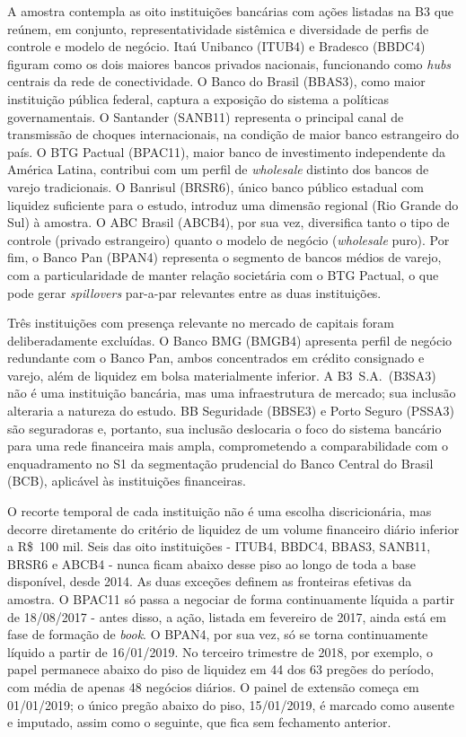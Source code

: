 \documentclass[12pt, a4paper, oneside, english, brazil]{abntex2}
\begin{document}
A amostra contempla as oito instituições bancárias com ações listadas na B3 que reúnem, em
conjunto, representatividade sistêmica e diversidade de perfis de controle e modelo de negócio.
Itaú Unibanco (ITUB4) e Bradesco (BBDC4) figuram como os dois maiores bancos privados nacionais,
funcionando como \textit{hubs} centrais da rede de conectividade. O Banco do Brasil (BBAS3),
como maior instituição pública federal, captura a exposição do sistema a políticas governamentais.
O Santander (SANB11) representa o principal canal de transmissão de choques internacionais, 
na condição de maior banco estrangeiro do país. O BTG Pactual (BPAC11), maior banco de 
investimento independente da América Latina, contribui com um perfil de \textit{wholesale} 
distinto dos bancos de varejo tradicionais. O Banrisul (BRSR6), único banco público estadual 
com liquidez suficiente para o estudo, introduz uma dimensão regional (Rio Grande do Sul) à 
amostra. O ABC Brasil (ABCB4), por sua vez, diversifica tanto o tipo de controle 
(privado estrangeiro) quanto o modelo de negócio (\textit{wholesale} puro). Por fim, o 
Banco Pan (BPAN4) representa o segmento de bancos médios de varejo, com a particularidade de 
manter relação societária com o BTG Pactual, o que pode gerar \textit{spillovers} 
par-a-par relevantes entre as duas instituições.

Três instituições com presença relevante no mercado de capitais foram deliberadamente
excluídas. O Banco BMG (BMGB4) apresenta perfil de negócio redundante com o Banco Pan,
ambos concentrados em crédito consignado e varejo, além de liquidez em bolsa
materialmente inferior. A B3~S.A.\ (B3SA3) não é uma instituição bancária, mas uma
infraestrutura de mercado; sua inclusão alteraria a natureza do estudo. BB Seguridade
(BBSE3) e Porto Seguro (PSSA3) são seguradoras e, portanto, sua inclusão deslocaria o foco
do sistema bancário para uma rede financeira mais ampla, comprometendo a comparabilidade
com o enquadramento no S1 da segmentação prudencial do Banco Central do Brasil (BCB),
aplicável às instituições financeiras.

O recorte temporal de cada instituição não é uma escolha discricionária, mas
decorre diretamente do critério de liquidez de um volume financeiro diário inferior a R\$~100 mil. 
Seis das oito instituições -
ITUB4, BBDC4, BBAS3, SANB11, BRSR6 e ABCB4 - nunca ficam abaixo desse piso ao
longo de toda a base disponível, desde 2014. As duas exceções definem as
fronteiras efetivas da amostra. O BPAC11 só passa a negociar de forma
continuamente líquida a partir de 18/08/2017 - antes disso, a ação, listada em
fevereiro de 2017, ainda está em fase de formação de \textit{book}. O BPAN4, por sua vez,
só se torna continuamente líquido a partir de 16/01/2019. No terceiro trimestre
de 2018, por exemplo, o papel permanece abaixo do piso de liquidez em 44 dos 63
pregões do período, com média de apenas 48 negócios diários. O painel de extensão começa em 01/01/2019; o único pregão abaixo do piso, 15/01/2019, é
marcado como ausente e imputado, assim como o seguinte, que fica sem fechamento anterior.
\end{document}
